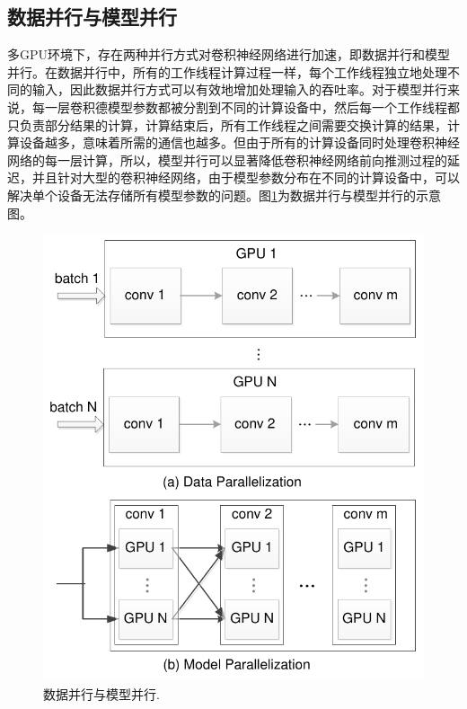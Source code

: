 \subsection{数据并行与模型并行}
多GPU环境下，存在两种并行方式对卷积神经网络进行加速，即数据并行和模型并行。在数据并行中，所有的工作线程计算过程一样，每个工作线程独立地处理不同的输入，因此数据并行方式可以有效地增加处理输入的吞吐率。对于模型并行来说，每一层卷积德模型参数都被分割到不同的计算设备中，然后每一个工作线程都只负责部分结果的计算，计算结束后，所有工作线程之间需要交换计算的结果，计算设备越多，意味着所需的通信也越多。但由于所有的计算设备同时处理卷积神经网络的每一层计算，所以，模型并行可以显著降低卷积神经网络前向推测过程的延迟，并且针对大型的卷积神经网络，由于模型参数分布在不同的计算设备中，可以解决单个设备无法存储所有模型参数的问题。图\ref{dataAndModelParallel}为数据并行与模型并行的示意图。

\begin{figure}[tbh]%
\centering
\includegraphics[width=12cm]{figs/dataAndModelParall.pdf}
\caption{数据并行与模型并行.}
\label{dataAndModelParallel}
\end{figure}

